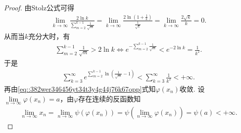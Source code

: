 \documentclass[../../main.tex]{subfiles}%
\begin{document}
\begin{proof}
由Stolz公式可得
\begin{align*}
\lim_{k \to \infty} \frac{2\ln k}{\sum\limits_{m=2}^{k-1} \frac{1}{\sqrt{m}}} = \lim_{k \to \infty} \frac{2\ln\left( 1 + \frac{1}{k} \right)}{\frac{1}{\sqrt{k}}} = \lim_{k \to \infty} \frac{2\sqrt{k}}{k} = 0.
\end{align*}
从而当$k$充分大时，有
\begin{align*}
\sum\limits_{m=2}^{k-1} \frac{1}{\sqrt{m}} > 2\ln k \Longleftrightarrow e^{-\sum\limits_{m=2}^{k-1} \frac{1}{\sqrt{m}}} < e^{-2\ln k} = \frac{1}{k^2}.
\end{align*}
于是
\begin{align*}
\sum\limits_{k=3}^{\infty} e^{\sum\limits_{m=2}^{k-1} \ln\left( \frac{1}{\sqrt{m}} - 1 \right)} < \sum\limits_{k=3}^{\infty} \frac{1}{k^2} < +\infty.
\end{align*}
再由\eqref{eq::382wer346456yt34t3y4g44j76k67opp}式知$\varphi(x_n)$收敛. 设$\lim\limits_{n \to \infty} \varphi(x_n) = a$，由$\varphi$存在连续的反函数知
\begin{align*}
\lim_{n\rightarrow \infty} x_n=\lim_{n\rightarrow \infty} \psi \left( \varphi \left( x_n \right) \right) =\psi \left( \lim_{n\rightarrow \infty} \varphi \left( x_n \right) \right) =\psi (a)<+\infty .
\end{align*}

\end{proof}
\end{document}
